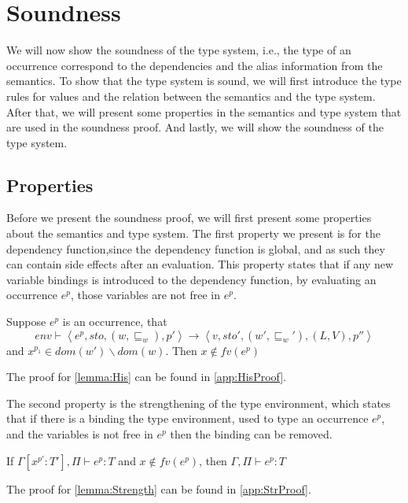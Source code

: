 \documentclass[../../master.tex]{subfiles}
\begin{document}
\section{Soundness}\label{sec:Soundness}
We will now show the soundness of the type system, i.e., the type of an occurrence correspond to the dependencies and the alias information from the semantics.
To show that the type system is sound, we will first introduce the type rules for values and the relation between the semantics and the type system.
After that, we will present some properties in the semantics and type system that are used in the soundness proof.
And lastly, we will show the soundness of the type system.




\subsection{Properties}
Before we present the soundness proof, we will first present some properties about the semantics and type system.
The first property we present is for the dependency function,since the dependency function is global, and as such they can contain side effects after an evaluation.
This property states that if any new variable bindings is introduced to the dependency function, by evaluating an occurrence $e^p$, those variables are not free in $e^p$.

\begin{lemma}[History]\label{lemma:His}
	Suppose $e^p$ is an occurrence, that
	$$env\vdash\left\langle e^{p},sto,(w,\sqsubseteq_w),p'\right\rangle\rightarrow\left\langle v,sto',(w',\sqsubseteq_w'),(L,V),p''\right\rangle$$
		and $x^{p_1}\in dom(w')\backslash dom(w)$.
		Then $x\notin fv(e^{p})$
\end{lemma}
The proof for \cref{lemma:His} can be found in \cref{app:HisProof}.

%

The second property is the strengthening of the type environment, which states that if there is a binding the type environment, used to type an occurrence $e^p$, and the variables is not free in $e^p$ then the binding can be removed.

\begin{lemma}[Strengthening]\label{lemma:Strength}
	If $\Gamma[x^{p'}:T'],\Pi\vdash e^{p}:T$ and $x\notin fv(e^p)$, then $\Gamma,\Pi\vdash e^{p}:T$
\end{lemma}
The proof for \cref{lemma:Strength} can be found in \cref{app:StrProof}.
%
\end{document}
